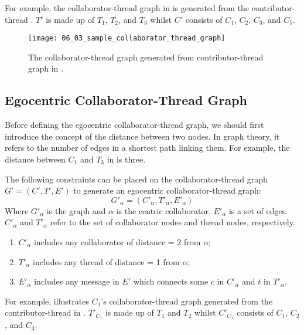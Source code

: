 For example, the collaborator-thread graph in  is generated from the contributor-thread . \(T'\) is made up of \(T_{1}\), \(T_{2}\), and \(T_{3}\) whilst \(C'\) consists of \(C_{1}\), \(C_{2}\), \(C_{3}\), and \(C_{5}\).

\begin{figure}[!htb]
  \centering
  \texttt{[image: 06\_03\_sample\_collaborator\_thread\_graph]}
  \caption{The collaborator-thread graph generated from contributor-thread graph in .}
  \label{Figure:06_03}
\end{figure}

\subsection{Egocentric Collaborator-Thread Graph}

Before defining the egocentric collaborator-thread graph, we should first introduce the concept of the distance between two nodes. In graph theory, it refers to the number of edges in a shortest path linking them. For example, the distance between \(C_{1}\) and \(T_{3}\) in  is three.

The following constraints can be placed on the collaborator-thread graph \(G'=(C', T', E')\) to generate an egocentric collaborator-thread graph:
\[G'_{\alpha}=(C'_{\alpha}, T'_{\alpha}, E'_{\alpha})\]
Where \(G'_{\alpha}\) is the graph and \(\alpha\) is the centric collaborator. \(E'_{\alpha}\) is a set of edges. \(C'_{\alpha}\) and \(T'_{\alpha}\) refer to the set of collaborator nodes and thread nodes, respectively.

\begin{enumerate}
	\item \(C'_{\alpha}\) includes any collaborator of distance = 2 from \(\alpha\); \\
	\item \(T'_{\alpha}\) includes any thread of distance = 1 from \(\alpha\); \\
	\item \(E'_{\alpha}\) includes any message in \(E'\) which connects some \(c\) in \(C'_{\alpha}\) and \(t\) in \(T'_{\alpha}\).
\end{enumerate}

For example,  illustrates \(C_{1}\)'s collaborator-thread graph generated from the contributor-thread in . \(T'_{C_1}\) is made up of \(T_{1}\) and \(T_{2}\) whilst \(C'_{C_1}\) consists of \(C_{1}\), \(C_{2}\), and \(C_{3}\).

